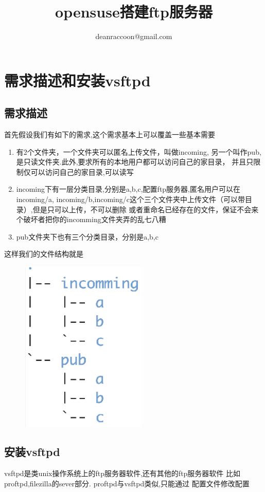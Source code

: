 \documentclass[adobefonts]{ctexart}
\title{\textbf{opensuse搭建ftp服务器}}
\author{deanraccoon@gmail.com}
\begin{document}
\maketitle
\tableofcontents

\newpage

\section{需求描述和安装vsftpd}
\subsection{需求描述}

首先假设我们有如下的需求,这个需求基本上可以覆盖一些基本需要
\begin{enumerate}
\item 有2个文件夹，一个文件夹可以匿名上传文件，叫做incoming,
  另一个叫作pub,是只读文件夹.此外,要求所有的本地用户都可以访问自己的家目录，
  并且只限制仅可以访问自己的家目录,可以读写
\item
  incoming下有一层分类目录,分别是a,b,c,配置ftp服务器,匿名用户可以在incoming/a,
  incoming/b,incoming/c这个三个文件夹中上传文件（可以带目录）,但是只可以上传，不可以删除
  或者重命名已经存在的文件，保证不会来个破坏者把你的incomming文件夹弄的乱七八糟
\item
  pub文件夹下也有三个分类目录，分别是a,b,c
\end{enumerate}
这样我们的文件结构就是
\begin{figure}[htbp]
  \includegraphics[width=6cm]{structure.eps}
\end{figure}
\subsection{安装vsftpd}
vsftpd是类unix操作系统上的ftp服务器软件,还有其他的ftp服务器软件
比如proftpd,filezilla的sever部分. proftpd与vsftpd类似,只能通过
配置文件修改配置
\end{document}
